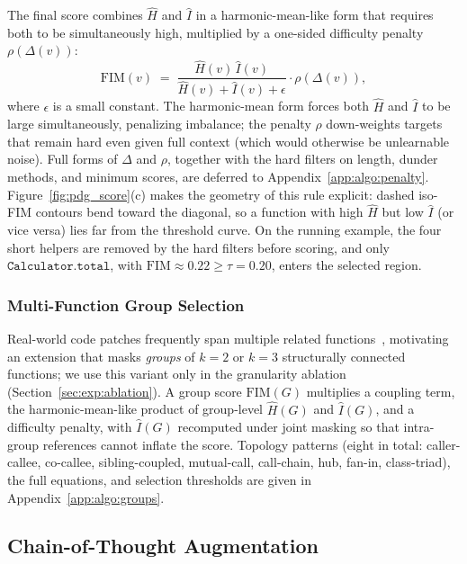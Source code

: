 The final score combines $\hat{H}$ and $\hat{I}$ in a harmonic-mean-like
form that requires both to be simultaneously high, multiplied by a
one-sided difficulty penalty $\rho(\Delta(v))$:
%
\begin{equation}
  \mathrm{FIM}(v) \;=\;
  \frac{\hat{H}(v)\,\hat{I}(v)}{\hat{H}(v) + \hat{I}(v) + \epsilon}
  \cdot \rho\!\left(\Delta(v)\right),
  \label{eq:fim_single}
\end{equation}
%
where $\epsilon$ is a small constant. The harmonic-mean form forces both
$\hat{H}$ and $\hat{I}$ to be large simultaneously, penalizing imbalance;
the penalty $\rho$ down-weights targets that remain hard even given full
context (which would otherwise be unlearnable noise). Full forms of
$\Delta$ and $\rho$, together with the hard filters on length, dunder
methods, and minimum scores, are deferred to
Appendix~\ref{app:algo:penalty}.
Figure~\ref{fig:pdg_score}(c) makes the geometry of this rule
explicit: dashed iso-FIM contours bend toward the diagonal, so a
function with high $\hat{H}$ but low $\hat{I}$ (or vice versa) lies far
from the threshold curve. On the running example, the four short
helpers are removed by the hard filters before scoring, and only
$\mathtt{Calculator.total}$, with
$\mathrm{FIM}\!\approx\!0.22\!\geq\!\tau\!=\!0.20$, enters the selected
region.

\subsubsection{Multi-Function Group Selection}
\label{sec:method:groups}

Real-world code patches frequently span multiple related
functions~\citep{swebench}, motivating an extension that masks
\emph{groups} of $k=2$ or $k=3$ structurally connected functions; we use
this variant only in the granularity ablation
(Section~\ref{sec:exp:ablation}). A group score $\mathrm{FIM}(G)$
multiplies a coupling term, the harmonic-mean-like product of
group-level $\hat{H}(G)$ and $\hat{I}(G)$, and a difficulty penalty,
with $\hat{I}(G)$ recomputed under joint masking so that intra-group
references cannot inflate the score. Topology patterns (eight in total:
caller-callee, co-callee, sibling-coupled, mutual-call, call-chain, hub,
fan-in, class-triad), the full equations, and selection thresholds are
given in Appendix~\ref{app:algo:groups}.

\subsection{Chain-of-Thought Augmentation}
\label{sec:method:cot}

